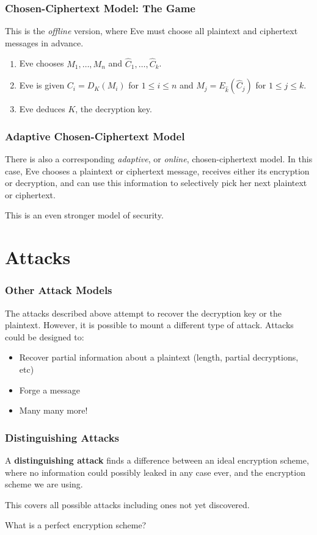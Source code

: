 \documentclass{beamer}
\newcommand{\<}{\langle}
\renewcommand{\>}{\rangle}
\begin{document}
\begin{frame}
\frametitle{Chosen-Ciphertext Model: The Game}

This is the \emph{offline} version, where Eve must choose all plaintext and ciphertext messages in advance. 
\begin{enumerate}
\item Eve chooses $M_1,\dots, M_n$ and $\hat C_1,\dots,\hat C_k$. 
\item Eve is given $C_i = D_K(M_i)$ for $1\le i\le n$ and $\hat M_j = E_{\hat k} (\hat C_j)$ for $1 \le j \le k$.
\item Eve deduces $K$, the decryption key. 
\end{enumerate}
\end{frame}

\begin{frame}
\frametitle{Adaptive Chosen-Ciphertext Model}

There is also a corresponding \emph{adaptive}, or \emph{online}, chosen-ciphertext model. In this case, Eve chooses a plaintext or ciphertext message, receives either its encryption or decryption, and can use this information to selectively pick her next plaintext or ciphertext. \newline

This is an even stronger model of security.
\end{frame}


\section{Attacks}

\begin{frame}
\frametitle{Other Attack Models}

The attacks described above attempt to recover the decryption key or the plaintext. However, it is possible to mount a different type of attack. Attacks could be designed to:
\begin{itemize}
\item Recover partial information about a plaintext (length, partial decryptions, etc)
\item Forge a message
\item Many many more!
\end{itemize}
\end{frame}

\begin{frame}
\frametitle{Distinguishing Attacks}

A \textbf{distinguishing attack} finds a difference between an ideal encryption scheme, where no information could possibly leaked in any case ever, and the encryption scheme we are using. \newline

This covers all possible attacks including ones not yet discovered.
\newline

What is a perfect encryption scheme?
\end{frame}
\end{document}
